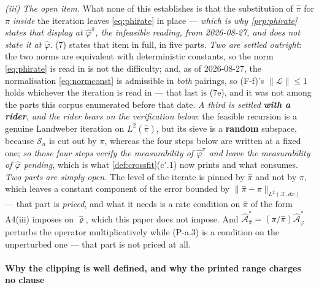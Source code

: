 \emph{(iii) The open item.} What none of this establishes is that the substitution of $\hat\pi$ for
$\pi$ \emph{inside} the iteration leaves \eqref{eq:phirate} in place --- \emph{which is why
\cref{prp:phirate} states that display at $\hat\varphi^{\pi}$, the infeasible reading, from 2026-08-27,
and does not state it at $\hat\varphi$}.
\textup{(7)} states that item in full, in five parts. \emph{Two are settled
outright}: the two norms are
equivalent with deterministic constants, so the norm \eqref{eq:phirate} is read in is not the
difficulty; and, as of 2026-08-27, the normalisation \eqref{eq:normconst} is admissible in \emph{both}
pairings, so \textup{(F-f)}'s $\|\mathcal L\|\le1$ holds whichever the iteration is read in --- that
last is \textup{(7e)}, and it was not among the parts this corpus enumerated before that date.
\emph{A third is settled \textbf{with a rider}, and the rider bears on the
verification below}: the feasible recursion is a genuine Landweber iteration on $L^{2}(\hat\pi)$, but
its sieve is a \textbf{random} subspace, because $\mathcal S_n$ is cut out
by $\pi$, whereas the four steps below are written at a fixed one; \emph{so those four steps verify the
measurability of $\hat\varphi^{\pi}$ and leave the measurability of $\hat\varphi$ pending}, which is
what \cref{def:crossfit}\textup{(c$'$.1)} now prints and what  consumes.
\emph{Two parts are simply open.} The level of the iterate is pinned by $\hat\pi$ and not by $\pi$, which
leaves a constant component of the error bounded by $\|\hat\pi-\pi\|_{L^{2}(\mathcal X,dx)}$ --- that
part is \emph{priced}, and what it needs is a rate condition on $\hat\pi$ of the form A4(iii) imposes on
$\hat\varrho$, which this paper does not impose. And
$\hat{\mathcal A}^\ast_{\hat\pi}=(\pi/\hat\pi)\hat{\mathcal A}^\ast_\varphi$ perturbs the operator
multiplicatively while (P-a.3) is a condition on the unperturbed one --- that part is not priced at all.

\paragraph{Why the clipping is well defined, and why the printed range charges no clause}


